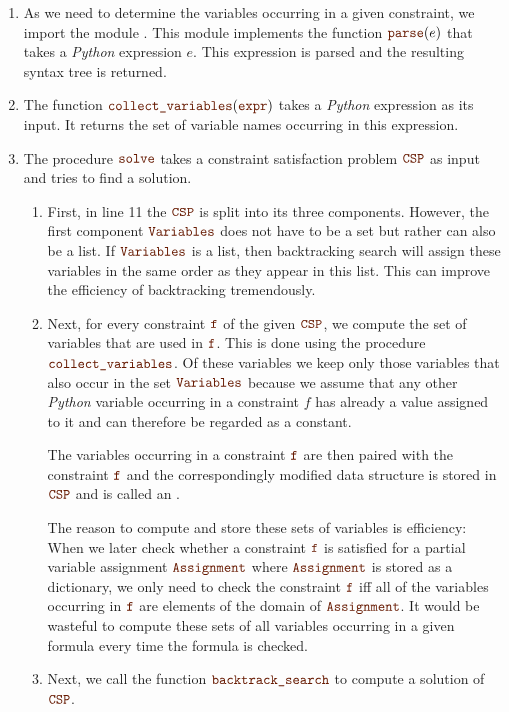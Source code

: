 \begin{enumerate}
\item As we need to determine the variables occurring in a given constraint, we import the module
      .  This module implements the function $\mytt{parse}(e)$ that takes
      a \textsl{Python} expression $e$.  This expression is parsed and the resulting syntax tree is returned.
\item The function $\mytt{collect\_variables}(\mytt{expr})$ takes a \textsl{Python} expression as its input.
      It returns the set of variable names occurring in this expression.
\item The procedure $\mytt{solve}$ takes a constraint satisfaction problem $\mytt{CSP}$ as input and tries
      to find a solution.    
      \begin{enumerate}
      \item First, in line 11 the $\mytt{CSP}$ is split into its three components.  However, the first
            component $\mytt{Variables}$ does not have to be a set but rather can also be a list.
            If $\mytt{Variables}$ is a list, then backtracking search will assign these variables 
            in the same order as they appear in this list.  This can improve the efficiency of backtracking
            tremendously. 
      \item Next, for every constraint $\mytt{f}$ of the given $\mytt{CSP}$, we compute the set of variables that
            are used in $\mytt{f}$.  This is done using the procedure $\mytt{collect\_variables}$.
            Of these variables we keep only those variables that also occur in the set $\mytt{Variables}$
            because we assume that any other \textsl{Python} variable occurring in a constraint $f$ has already
            a value assigned to it and can therefore be regarded as a constant.

            The variables occurring in a constraint $\mytt{f}$ are then paired with the constraint $\mytt{f}$ and
            the correspondingly modified data structure is stored in $\mytt{CSP}$ and is called an
            .

            The reason to compute and store these sets of variables is efficiency: When we later check whether
            a constraint $\mytt{f}$ is satisfied for a partial variable assignment $\mytt{Assignment}$ where $\mytt{Assignment}$ is
            stored as a dictionary, we only need to check the constraint $\mytt{f}$ iff all of the variables occurring
            in $\mytt{f}$ are elements of the domain of $\mytt{Assignment}$.   It would be wasteful to compute
            these sets of all variables occurring in a given formula every time the formula is checked.
      \item Next, we call the function $\mytt{backtrack\_search}$ to compute a solution of $\mytt{CSP}$.
   \end{enumerate}
 \end{enumerate}

